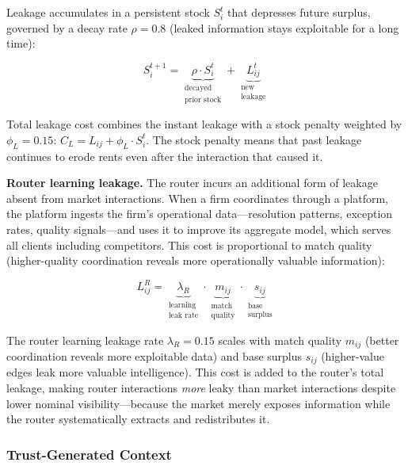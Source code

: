\documentclass[12pt]{article}
\theoremstyle{definition}
\begin{document}
Leakage accumulates in a persistent stock $S_i^t$ that depresses future surplus, governed by a decay rate $\rho = 0.8$ (leaked information stays exploitable for a long time):

\begin{equation}
\label{eq:leakstock}
S_i^{t+1} = \underbrace{\rho \cdot S_i^t}_{\substack{\text{decayed} \\ \text{prior stock}}} + \underbrace{L_{ij}^t}_{\substack{\text{new} \\ \text{leakage}}}
\end{equation}

\noindent Total leakage cost combines the instant leakage with a stock penalty weighted by $\phi_L = 0.15$: $C_L = L_{ij} + \phi_L \cdot S_i^t$. The stock penalty means that past leakage continues to erode rents even after the interaction that caused it.

\textbf{Router learning leakage.} The router incurs an additional form of leakage absent from market interactions. When a firm coordinates through a platform, the platform ingests the firm's operational data---resolution patterns, exception rates, quality signals---and uses it to improve its aggregate model, which serves all clients including competitors. This cost is proportional to match quality (higher-quality coordination reveals more operationally valuable information):

\begin{equation}
\label{eq:routerleak}
L^R_{ij} = \underbrace{\lambda_R}_{\substack{\text{learning} \\ \text{leak rate}}} \cdot \underbrace{m_{ij}}_{\substack{\text{match} \\ \text{quality}}} \cdot \underbrace{s_{ij}}_{\substack{\text{base} \\ \text{surplus}}}
\end{equation}

\noindent The router learning leakage rate $\lambda_R = 0.15$ scales with match quality $m_{ij}$ (better coordination reveals more exploitable data) and base surplus $s_{ij}$ (higher-value edges leak more valuable intelligence). This cost is added to the router's total leakage, making router interactions \textit{more} leaky than market interactions despite lower nominal visibility---because the market merely exposes information while the router systematically extracts and redistributes it.

\subsubsection{Trust-Generated Context}
\label{sec:trust}
\end{document}

